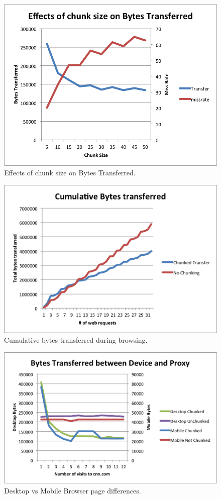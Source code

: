 \begin{figure}[h] 
\centering \includegraphics[scale=0.40]{images/chunksize2.png}
\caption{Effects of chunk size on Bytes Transferred.}
\label{fig:mobsim_ui}
\end{figure}

\begin{figure}[h] 
\centering \includegraphics[scale=0.40]{images/cumulbrowsing.png}
\caption{Cumulative bytes transferred during browsing.}
\label{fig:mobsim_ui}
\end{figure}

\begin{figure}[h] 
\centering \includegraphics[scale=0.40]{images/desktopmobile.png}
\caption{Desktop vs Mobile Browser page differences.}
\label{fig:mobsim_ui}
\end{figure}

